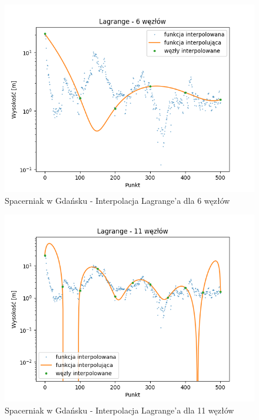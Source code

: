 \documentclass[12pt]{extarticle}
\begin{document}
\begin{figure}[H]
    \centering
    \includegraphics[scale=0.8]{interpolation_SpacerniakGdansk_Lagrange_6.png}
    \caption{Spacerniak w Gdańsku - Interpolacja Lagrange'a dla 6 węzłów}
\end{figure}
\begin{figure}[H]
    \centering
    \includegraphics[scale=0.8]{interpolation_SpacerniakGdansk_Lagrange_11.png}
    \caption{Spacerniak w Gdańsku - Interpolacja Lagrange'a dla 11 węzłów}
\end{figure}
\end{document}

